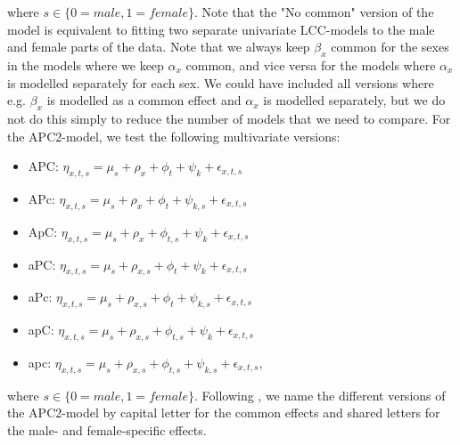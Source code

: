 where $s \in \{0 = male, 1 = female\}$. Note that the "No common" version of the model is equivalent to fitting two separate univariate LCC-models to the male and female parts of the data. Note that we always keep $\beta_x$ common for the sexes in the models where we keep $\alpha_x$ common, and vice versa for the models where $\alpha_x$ is modelled separately for each sex. We could have included all versions where e.g. $\beta_x$ is modelled as a common effect and $\alpha_x$ is modelled separately, but we do not do this simply to reduce the number of models that we need to compare. For the APC2-model, we test the following multivariate versions:
\begin{itemize}
    \item APC: $\eta_{x,t,s}= \mu_{s} + \rho_x + \phi_t + \psi_k + \epsilon_{x,t,s}$ 
    \item APc: $\eta_{x,t,s}= \mu_{s} + \rho_x + \phi_t + \psi_{k,s} + \epsilon_{x,t,s}$ 
    \item ApC: $\eta_{x,t,s}= \mu_{s} + \rho_x + \phi_{t,s} + \psi_{k} + \epsilon_{x,t,s}$ 
    \item aPC: $\eta_{x,t,s}= \mu_{s} + \rho_{x,s} + \phi_{t} + \psi_{k} + \epsilon_{x,t,s}$ 
    \item aPc: $\eta_{x,t,s}= \mu_{s} + \rho_{x,s} + \phi_{t} + \psi_{k,s} + \epsilon_{x,t,s}$ 
    \item apC: $\eta_{x,t,s}= \mu_{s} + \rho_{x,s} + \phi_{t, s} + \psi_{k} + \epsilon_{x,t,s}$ 
    \item apc: $\eta_{x,t,s}= \mu_{s} + \rho_{x,s} + \phi_{t, s} + \psi_{k, s} + \epsilon_{x,t,s}$,
\end{itemize}
where $s \in \{0 = male, 1 = female\}$. Following \textcite{rieblerHeld2010}, we name the different versions of the APC2-model by capital letter for the common effects and shared letters for the male- and female-specific effects.  

